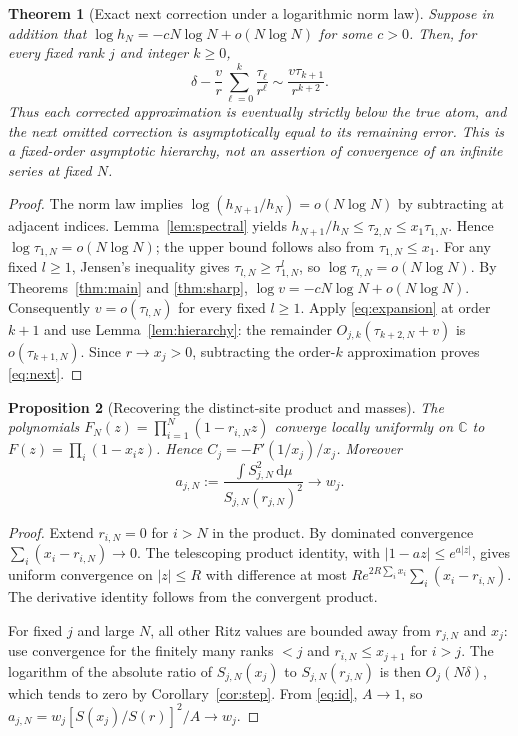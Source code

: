 \documentclass[11pt]{article}
\newtheorem{theorem}{Theorem}[section]
\newtheorem{proposition}[theorem]{Proposition}
\theoremstyle{remark}\newtheorem{remark}[theorem]{Remark}
\newcommand{\C}{\mathbb C}
\newcommand{\dd}{\,\mathrm d}
\begin{document}
\begin{theorem}[Exact next correction under a logarithmic norm law]\label{thm:next}
Suppose in addition that $\log h_N=-cN\log N+o(N\log N)$ for some $c>0$. Then, for every fixed rank $j$ and integer $k\ge0$,
\begin{equation}\label{eq:next}
 \boxed{\delta-\frac vr\sum_{\ell=0}^{k}\frac{\tau_\ell}{r^\ell}
 \sim \frac{v\tau_{k+1}}{r^{k+2}}.}
\end{equation}
Thus each corrected approximation is eventually strictly below the true atom, and the next omitted correction is asymptotically equal to its remaining error. This is a fixed-order asymptotic hierarchy, not an assertion of convergence of an infinite series at fixed $N$.
\end{theorem}
\begin{proof}
The norm law implies $\log(h_{N+1}/h_N)=o(N\log N)$ by subtracting at adjacent indices. Lemma~\ref{lem:spectral} yields $h_{N+1}/h_N\le\tau_{2,N}\le x_1\tau_{1,N}$. Hence $\log\tau_{1,N}=o(N\log N)$; the upper bound follows also from $\tau_{1,N}\le x_1$. For any fixed $l\ge1$, Jensen's inequality gives $\tau_{l,N}\ge\tau_{1,N}^l$, so $\log\tau_{l,N}=o(N\log N)$. By Theorems~\ref{thm:main} and \ref{thm:sharp}, $\log v=-cN\log N+o(N\log N)$. Consequently $v=o(\tau_{l,N})$ for every fixed $l\ge1$. Apply \eqref{eq:expansion} at order $k+1$ and use Lemma~\ref{lem:hierarchy}: the remainder $O_{j,k}(\tau_{k+2,N}+v)$ is $o(\tau_{k+1,N})$. Since $r\to x_j>0$, subtracting the order-$k$ approximation proves \eqref{eq:next}.
\end{proof}

\begin{proposition}[Recovering the distinct-site product and masses]\label{prop:product}
The polynomials $F_N(z)=\prod_{i=1}^N(1-r_{i,N}z)$ converge locally uniformly on $\C$ to $F(z)=\prod_i(1-x_iz)$. Hence $C_j=-F'(1/x_j)/x_j$. Moreover
\[
 a_{j,N}:=\frac{\int S_{j,N}^2\dd\mu}{S_{j,N}(r_{j,N})^2}\longrightarrow w_j.
\]
\end{proposition}
\begin{proof}
Extend $r_{i,N}=0$ for $i>N$ in the product. By dominated convergence $\sum_i(x_i-r_{i,N})\to0$. The telescoping product identity, with $|1-az|\le e^{a|z|}$, gives uniform convergence on $|z|\le R$ with difference at most $R e^{2R\sum_i x_i}\sum_i(x_i-r_{i,N})$. The derivative identity follows from the convergent product.

For fixed $j$ and large $N$, all other Ritz values are bounded away from $r_{j,N}$ and $x_j$: use convergence for the finitely many ranks $<j$ and $r_{i,N}\le x_{j+1}$ for $i>j$. The logarithm of the absolute ratio of $S_{j,N}(x_j)$ to $S_{j,N}(r_{j,N})$ is then $O_j(N\delta)$, which tends to zero by Corollary~\ref{cor:step}. From \eqref{eq:id}, $A\to1$, so $a_{j,N}=w_j[S(x_j)/S(r)]^2/A\to w_j$.
\end{proof}
\end{document}
